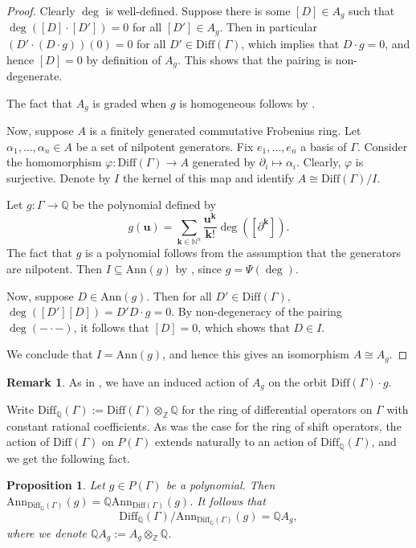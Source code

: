 \documentclass[oneside]{amsart}
\theoremstyle{plain}
\newtheorem{proposition}[theorem]{Proposition}
\theoremstyle{definition}
\newtheorem{remark}[theorem]{Remark}
\newcommand{\Z}{{\mathbb{Z}}}
\newcommand{\N}{{\mathbb{N}}}
\newcommand{\Q}{{\mathbb{Q}}}
\newcommand{\Ann}{{\mathrm{Ann}}}
\newcommand{\Diff}{{\mathrm{Diff}}}
\begin{document}
\begin{proof}
    Clearly $\deg$ is well-defined. Suppose there is some $[D] \in A_g$ such that
    $\deg([D] \cdot [D']) = 0$ for all $[D'] \in A_g$. Then in particular
    $(D' \cdot (D \cdot g)) (0) = 0$ for all $D' \in \Diff(\Gamma)$,
    which implies that $D \cdot g = 0$, and hence $[D] = 0$ by definition of $A_g$. This shows that the pairing is non-degenerate.

    The fact that $A_g$ is graded when $g$ is homogeneous follows by .

    Now, suppose $A$ is a finitely generated commutative Frobenius ring. 
    Let $\alpha_1, \dots, \alpha_n \in A$ be a set of nilpotent generators.
    Fix $e_1, \dots, e_n$ a basis of $\Gamma$.
    Consider the homomorphism
    $\varphi: \Diff(\Gamma) \to A$
    generated by $\partial_i \mapsto \alpha_i$. Clearly, $\varphi$ is surjective. Denote by $I$ the kernel of this map and identify $A \cong \Diff(\Gamma)/I$.

    Let $g: \Gamma \to \Q$ be the polynomial defined by
    \[g(\mathbf{u}) = \sum_{\mathbf{k} \in \N^n} \frac{\mathbf{u}^\mathbf{k}}{\mathbf{k}!}\deg([\partial^\mathbf{k}]).\]
    The fact that $g$ is a polynomial follows from the assumption that the generators are nilpotent. Then $I \subseteq \Ann(g)$ by , since $g = \Psi(\deg)$.
    
    Now, suppose $D \in \Ann(g)$.
    Then for all $D' \in \Diff(\Gamma)$,
    $\deg([D'][D]) = D'D \cdot g = 0$.
    By non-degeneracy of the pairing $\deg(-\cdot-)$, it follows that $[D] = 0$,
    which shows that $D \in I$.

    We conclude that $I = \Ann(g)$, and hence this gives an isomorphism $A \cong A_g$.
\end{proof}

\begin{remark}
    As in , we have an induced action of $A_g$ on the orbit
    $\Diff(\Gamma) \cdot g$.
\end{remark}


Write $\Diff_\Q(\Gamma) := \Diff(\Gamma) \otimes_\Z \Q$ for the ring of differential operators on $\Gamma$ with constant rational coefficients.
As was the case for the ring of shift operators, the action of $\Diff(\Gamma)$ on $P(\Gamma)$
extends naturally to an action of $\Diff_\Q(\Gamma)$, and we get the following fact.

\begin{proposition}\label{prop:ann-diff-rational}
    Let $g \in P(\Gamma)$ be a polynomial.
    Then
    $\Ann_{\Diff_\Q(\Gamma)}(g) = \Q\Ann_{\Diff(\Gamma)}(g)$.
    It follows that 
    \[\Diff_\Q(\Gamma)/\Ann_{\Diff_\Q(\Gamma)}(g) = \Q A_g,\]
    where we denote $\Q A_g := A_g \otimes_\Z \Q$.
\end{proposition}
\end{document}
